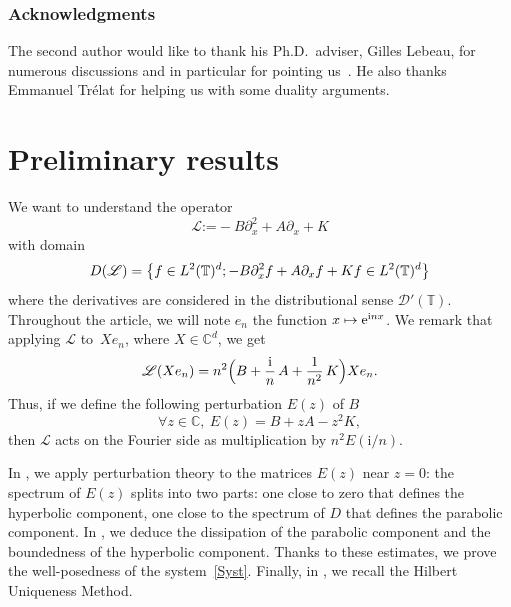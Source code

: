 \documentclass[10pt]{amsart}
\let\mathcal\mathscr
\def\mto{\mathchoice{\longmapsto}{\mapsto}{\mapsto}{\mapsto}}
\theoremstyle{plain}
\theoremstyle{definition}
\theoremstyle{remark}
\newcommand{\set}{\mathbb}
\renewcommand{\C}{\set{C}}
\newcommand{\T}{\set{T}}
\newcommand{\coloneqq}{\mathrel{\mathord{:}\mathord=}}
\newcommand{\eu}{\mathrm e}
\newcommand{\iu}{\mathrm i}
\let\originalleft\left
\let\originalright\right
\renewcommand{\left}{\mathopen{}\mathclose\bgroup\originalleft}
\renewcommand{\right}{\aftergroup\egroup\originalright}
\begin{document}
\subsubsection*{Acknowledgments}
The second author would like to thank his Ph.D.\ adviser, Gilles Lebeau, for numerous discussions and in particular for pointing us~\cite{lebeau_1998}. He also thanks Emmanuel Trélat for helping us with some duality arguments.

\section{Preliminary results} \label{Sec:Prel}

We want to understand the operator\vspace*{-3pt}
\begin{equation} \label{defL}
\mathcal{L} \coloneqq -B\partial_{x}^2 + A \partial_{x} + K
\end{equation}
with domain\vspace*{-3pt}\enlargethispage{\baselineskip}%
\begin{equation} \label{def:D(L)}
D(\mathcal{L})=\left\{ f \in L^2(\T)^d ; -B\partial_{x}^2f + A \partial_{x}f + K f \in L^2(\T)^d \right\}
\end{equation}
where the derivatives are considered in the distributional sense $\mathcal{D}'(\T)$.
Throughout the article, we will note $e_n$ the function $x\mto \eu^{\iu nx}$.
We remark that applying $\mathcal L$ to~$X e_n$, where $X \in \C^{d}$, we get\vspace*{-3pt}
\begin{equation}
\label{FourierOp}
\mathcal L (X e_n) = n^{2}\Bigl(B +\frac{\iu}{n}\, A + \frac{1}{n^{2}}\,K\Bigr)X e_n.
\end{equation}
Thus, if we define the following perturbation $E(z)$ of $B$\vspace*{-3pt}
\begin{equation}
\label{defBh}
\forall z \in \C,\ E(z) = B + z A - z^{2} K,
\end{equation}
then $\mathcal L$ acts on the Fourier side as multiplication by $n^2E(\iu /n)$.

In , we apply perturbation theory to the matrices $E(z)$ near $z=0$: the spectrum of $E(z)$ splits into two parts: one close to zero that defines the hyperbolic component, one close to the spectrum of $D$ that defines the parabolic component. In , we deduce the dissipation of the parabolic component and the boundedness of the hyperbolic component. Thanks to these estimates, we prove the well-posedness of the system~\eqref{Syst}. Finally, in , we recall the Hilbert Uniqueness Method.
\end{document}
